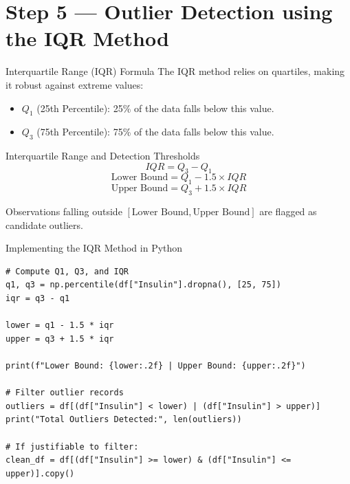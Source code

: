 \documentclass[aspectratio=169,11pt]{beamer}
\newcommand{\smallgap}{\vspace{0.35em}}
\begin{document}
\section{Step 5 — Outlier Detection using the IQR Method}

\begin{frame}{Interquartile Range (IQR) Formula}
The IQR method relies on quartiles, making it robust against extreme values:
\begin{itemize}
  \item $Q_1$ (25th Percentile): 25\% of the data falls below this value.
  \item $Q_3$ (75th Percentile): 75\% of the data falls below this value.
\end{itemize}

\begin{block}{Interquartile Range and Detection Thresholds}
\[
IQR = Q_3 - Q_1
\]
\[
\text{Lower Bound} = Q_1 - 1.5 \times IQR
\]
\[
\text{Upper Bound} = Q_3 + 1.5 \times IQR
\]
\end{block}

\smallgap
Observations falling outside $[\text{Lower Bound}, \text{Upper Bound}]$ are flagged as candidate outliers.
\end{frame}

\begin{frame}[fragile]{Implementing the IQR Method in Python}
\begin{lstlisting}[style=pythonstyle]
# Compute Q1, Q3, and IQR
q1, q3 = np.percentile(df["Insulin"].dropna(), [25, 75])
iqr = q3 - q1

lower = q1 - 1.5 * iqr
upper = q3 + 1.5 * iqr

print(f"Lower Bound: {lower:.2f} | Upper Bound: {upper:.2f}")

# Filter outlier records
outliers = df[(df["Insulin"] < lower) | (df["Insulin"] > upper)]
print("Total Outliers Detected:", len(outliers))

# If justifiable to filter:
clean_df = df[(df["Insulin"] >= lower) & (df["Insulin"] <= upper)].copy()
\end{lstlisting}
\end{frame}
\end{document}
